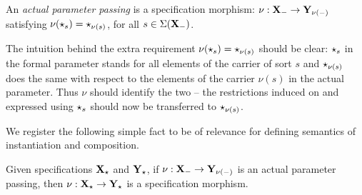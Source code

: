 \begin{definition}
An {\em actual parameter passing} is a specification morphism:
$\nu:{\bf X_-} \to {\bf Y_{\nu(-)}}$ satisfying
$\nu(\star_s) = \star_{\nu(s)}$, for all $s \in \Sigma({\bf X_-})$.
\end{definition}
The intuition behind the extra requirement $\nu(\star_s) = \star_{\nu(s)}$
should be clear: $\star_s$ in the formal parameter stands for all elements of
the carrier of sort $s$ and  $\star_{\nu(s)}$ does the same with respect to the
elements of the carrier $\nu(s)$ in the actual parameter. Thus $\nu$ should
identify the two --  the restrictions induced on and expressed using
$\star_s$ should now be transferred to $\star_{\nu(s)}$.

We register the following simple fact to be of relevance for defining
semantics of instantiation and composition.

\begin{lemma}\label{le:id-^-1}
Given specifications ${\bf X}_\star$ and ${\bf Y}_\star$, 
if $\nu:{\bf X_-}\to {\bf Y_{\nu(-)}}$ is an actual parameter passing,
then $\nu:{\bf X}_\star\to {\bf Y}_\star$ is a specification morphism.
\end{lemma}

